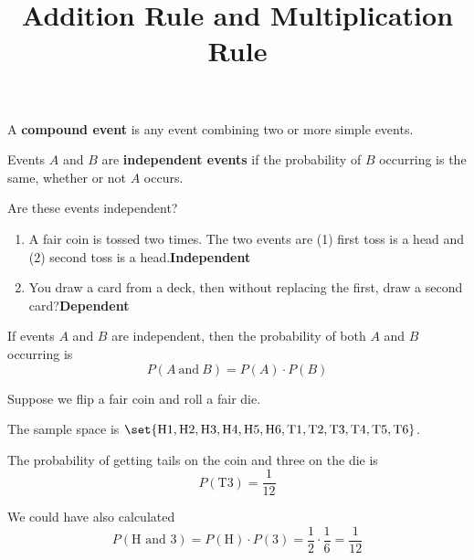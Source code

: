 \documentclass{beamer}
\title[MA205 - Section 4.2]{Addition Rule and Multiplication Rule}
\newcommand{\prob}[1]{P\left(#1\right)}
\begin{document}
\begin{frame}
\titlepage
\end{frame}

\begin{frame}
\begin{definition}
A \textbf{compound event} is any event combining two or more simple events.
\end{definition}\pause

\begin{definition}
Events $A$ and $B$ are \textbf{independent events} if the probability of $B$ occurring is the same, whether or not $A$ occurs.
\end{definition}\pause

\begin{example}
Are these events independent?
\begin{enumerate}
\item A fair coin is tossed two times. The two events are (1) first toss is a head and (2) second toss is a head.\pause \quad\textbf{Independent}\pause
\item You draw a card from a deck, then without replacing the first, draw a second card?\pause \quad\textbf{Dependent}
\end{enumerate}
\end{example}
\end{frame}

\begin{frame}
\begin{definition}
If events $A$ and $B$ are independent, then the probability of both $A$ and $B$ occurring is
\begin{equation*}
\prob{A~\text{and}~B}=\prob{A} \cdot \prob{B}
\end{equation*}
\end{definition}\pause

\begin{example}
Suppose we flip a fair coin and roll a fair die. 

\vspace{2mm}
The sample space is $\set{\text{H1}, \text{H2}, \text{H3}, \text{H4}, \text{H5}, \text{H6}, \text{T1}, \text{T2}, \text{T3}, \text{T4}, \text{T5}, \text{T6}}$.\pause

\vspace{2mm}
The probability of getting tails on the coin and three on the die is 
\begin{equation*}
\prob{\text{T3}}=\dfrac{1}{12}
\end{equation*}\pause

We could have also calculated
\begin{equation*}
\prob{\text{H and 3}} = \prob{\text{H}}\cdot\prob{3} = \dfrac{1}{2}\cdot\dfrac{1}{6} = \dfrac{1}{12}
\end{equation*}
\end{example}
\end{frame}
\end{document}

